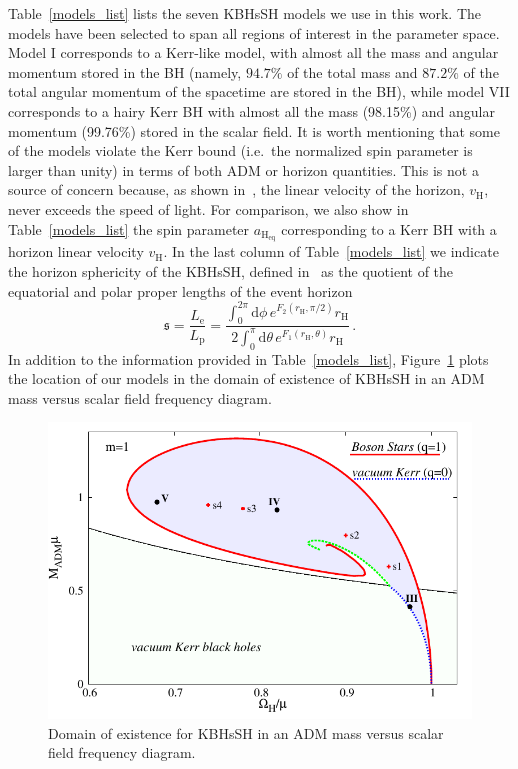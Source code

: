 \documentclass[twocolumn,aps,showpacs,showkeys,prd,superscriptaddress,byrevtex, amsmath]{revtex4-1}
\begin{document}
Table~\ref{models_list} lists the seven KBHsSH models we use in this work. The models have been selected to span all regions of interest in the parameter space. Model I corresponds to a Kerr-like model, with almost all the mass and angular momentum stored in the BH (namely, $94.7\%$ of the total mass and $87.2\%$ of the total angular momentum of the spacetime are stored in the BH), while model VII corresponds to a hairy Kerr BH with almost all the mass (98.15\%) and angular momentum (99.76\%) stored in the scalar field. It is worth mentioning that some of the models violate the Kerr bound (i.e.~the normalized spin parameter is larger than unity) in terms of both ADM or horizon quantities. This is not a source of concern because, as shown in~\cite{Herdeiro:2015c}, the linear velocity of the horizon, $v_{\mathrm{H}}$, never exceeds the speed of light. For comparison, we also show in Table~\ref{models_list} the spin parameter $a_{\mathrm{H_{eq}}}$ corresponding to a Kerr BH with a horizon linear velocity $v_{\mathrm{H}}$. In the last column of Table~\ref{models_list} we indicate the horizon sphericity of the KBHsSH, defined in~\cite{Delgado:2018} as the quotient of the equatorial and polar proper lengths of the event horizon
\begin{equation}
\mathfrak{s} = \frac{L_{\mathrm{e}}}{L_{\mathrm{p}}} = \frac{\int^{2\pi}_{0} \mathrm{d}\phi \, e^{F_2(r_{\mathrm{H}}, \pi/2)} r_{\mathrm{H}}}{2\int^{\pi}_{0} \mathrm{d} \theta \, e^{F_1(r_{\mathrm{H}}, \theta)} r_{\mathrm{H}}}\,.
\end{equation}
In addition to the information provided in Table~\ref{models_list}, Figure~\ref{existence} plots the location of our models in the domain of existence of KBHsSH in an ADM mass versus scalar field frequency diagram.  

\begin{figure}
\centering
\includegraphics[scale=0.7]{figures/existence-eps-converted-to.pdf}
\caption{Domain of existence for KBHsSH in an ADM mass versus scalar
field frequency diagram. }
\label{existence}
\end{figure}
\end{document}
